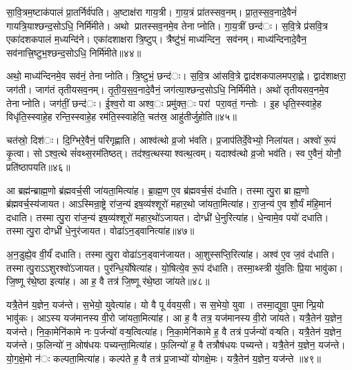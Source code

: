 
सा॒वि॒त्रम॒ष्टाक॑पालं प्रा॒तर्निर्व॑पति। अ॒ष्टाक्ष॑रा गाय॒त्री। गा॒य॒त्रं प्रा॑तस्सव॒नम्। प्रा॒त॒स्स॒व॒नादे॒वैनं॑ गायत्रि॒याश्छन्द॒सोऽधि॒ निर्मि॑मीते। अथो प्रातस्सव॒नमे॒व तेनाप्नोति। गा॒य॒त्रीं छन्द॑ः। स॒वि॒त्रे प्र॑सवि॒त्र एका॑दशकपालं म॒ध्यन्दि॑ने। एका॑दशाक्षरा त्रि॒ष्टुप्। त्रैष्टु॑भं॒ माध्य॑न्दिन॒ सव॑नम्। माध्य॑न्दिनादे॒वैन॒ सव॑नात्त्रि॒ष्टुभ॒श्छन्द॒सोऽधि॒ निर्मि॑मीते॥४४॥

अथो॒ माध्य॑न्दिनमे॒व सव॑नं॒ तेनाप्नोति। त्रि॒ष्टुभं॒ छन्द॑ः। स॒वि॒त्र आ॑सवि॒त्रे द्वाद॑शकपालमपरा॒ह्णे। द्वाद॑शाक्षरा॒ जग॑ती। जाग॑तं तृतीयसव॒नम्। तृ॒ती॒य॒स॒व॒नादे॒वैनं॒ जग॑त्या॒श्छन्द॒सोऽधि॒ निर्मि॑मीते। अथो॑ तृतीयसव॒नमे॒व तेनाप्नोति। जग॑तीं॒ छन्द॑ः। ई॒श्व॒रो वा अश्व॒ः प्रमु॑क्त॒ः परां परा॒वतं॒ गन्तोः। इ॒ह धृति॒स्स्वाहे॒ह विधृ॑ति॒स्स्वाहे॒ह रन्ति॒स्स्वाहे॒ह रम॑ति॒स्स्वाहेति॒ चत॑स्र॒ आहु॑तीर्जुहोति॥४५॥

चत॑स्रो॒ दिश॑ः। दि॒ग्भिरे॒वैनं॒ परि॑गृह्णाति। आश्व॑त्थो व्र॒जो भ॑वति। प्र॒जाप॑तिर्दे॒वेभ्यो॒ निला॑यत। अश्वो॑ रू॒पं कृ॒त्वा। सोऽश्व॒त्थे सं॑वथ्स॒रम॑तिष्ठत्। तद॑श्व॒त्थस्याश्वत्थ॒त्वम्। यदाश्व॑त्थो व्र॒जो भव॑ति। स्व ए॒वैनं॒ योनौ॒ प्रति॑ष्ठापयति॥४६॥


आ ब्रह्म॑न्ब्राह्म॒णो ब्र॑ह्मवर्च॒सी जा॑यता॒मित्या॑ह। ब्रा॒ह्म॒ण ए॒व ब्र॑ह्मवर्च॒सं द॑धाति। तस्मात्पु॒रा ब्राह्म॒णो ब्र॑ह्मवर्च॒स्य॑जायत। आऽस्मिन्रा॒ष्ट्रे रा॑ज॒न्य॑ इष॒व्य॑श्शूरो॑ महार॒थो जा॑यता॒मित्या॑ह। रा॒ज॒न्य॑ ए॒व शौ॒र्यं म॑हि॒मानं॑ दधाति। तस्मात्पु॒रा रा॑ज॒न्य॑ इष॒व्य॑श्शूरो॑ महार॒थो॑ऽजायत। दोग्ध्री॑ धे॒नुरित्या॑ह। धे॒न्वामे॒व पयो॑ दधाति। तस्मात्पु॒रा दोग्ध्री॑ धे॒नुर॑जायत। वोढा॑ऽन॒ड्वानित्या॑ह॥४७॥

अ॒न॒डुह्ये॒व वी॒र्यं॑ दधाति। तस्मात्पु॒रा वोढा॑ऽन॒ड्वान॑जायत। आ॒शुस्सप्ति॒रित्या॑ह। अश्व॑ ए॒व ज॒वं द॑धाति। तस्मात्पु॒राऽऽशुरश्वो॑ऽजायत। पुर॑न्धि॒र्योषेत्या॑ह। यो॒षित्ये॒व रू॒पं द॑धाति। तस्मा॒थ्स्त्री यु॑व॒तिः प्रि॒या भावु॑का। जि॒ष्णू र॑थे॒ष्ठा इत्या॑ह। आ ह॒ वै तत्र॑ जि॒ष्णू र॑थे॒ष्ठा जा॑यते॥४८॥

यत्रै॒तेन॑ य॒ज्ञेन॒ यज॑न्ते। स॒भेयो॒ युवेत्या॑ह। यो वै पूर्ववय॒सी। स स॒भेयो॒ युवा। तस्मा॒द्युवा॒ पुमान्प्रि॒यो भावु॑कः। आऽस्य यज॑मानस्य वी॒रो जा॑यता॒मित्या॑ह। आ ह॒ वै तत्र॒ यज॑मानस्य वी॒रो जा॑यते। यत्रै॒तेन॑ य॒ज्ञेन॒ यज॑न्ते। नि॒का॒मेनि॑कामे नः प॒र्जन्यो॑ वऱ्ष॒त्वित्या॑ह। नि॒का॒मेनि॑कामे ह॒ वै तत्र॑ प॒र्जन्यो॑ वऱ्षति। यत्रै॒तेन॑ य॒ज्ञेन॒ यज॑न्ते। फ॒लिन्यो॑ न॒ ओष॑धयः पच्यन्ता॒मित्या॑ह। फ॒लिन्यो॑ ह॒ वै तत्रौष॑धयः पच्यन्ते। यत्रै॒तेन॑ य॒ज्ञेन॒ यज॑न्ते। यो॒ग॒क्षे॒मो न॑ः कल्पता॒मित्या॑ह। कल्प॑ते ह॒ वै तत्र॑ प्र॒जाभ्यो॑ योगक्षे॒मः। यत्रै॒तेन॑ य॒ज्ञेन॒ यज॑न्ते ॥४९॥


